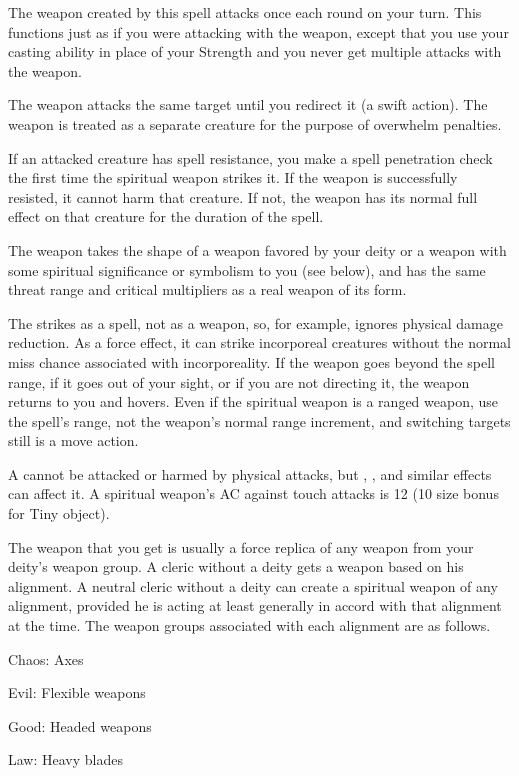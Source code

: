 \spellrng{\rngmed}
\begin{spelleffect}
  The weapon created by this spell attacks once each round on your turn. This functions just as if you were attacking with the weapon, except that you use your casting ability in place of your Strength and you never get multiple attacks with the weapon.
  \par The weapon attacks the same target until you redirect it (a swift action). The weapon is treated as a separate creature for the purpose of overwhelm penalties.
  \par If an attacked creature has spell resistance, you make a spell penetration check the first time the spiritual weapon strikes it. If the weapon is successfully resisted, it cannot harm that creature. If not, the weapon has its normal full effect on that creature for the duration of the spell.
  \par The weapon takes the shape of a weapon favored by your deity or a weapon with some spiritual significance or symbolism to you (see below), and has the same threat range and critical multipliers as a real weapon of its form.
\end{spelleffect}
\begin{spellnotes}
  The  strikes as a spell, not as a weapon, so, for example, ignores physical damage reduction. As a force effect, it can strike incorporeal creatures without the normal miss chance associated with incorporeality. If the weapon goes beyond the spell range, if it goes out of your sight, or if you are not directing it, the weapon returns to you and hovers. Even if the spiritual weapon is a ranged weapon, use the spell's range, not the weapon's normal range increment, and switching targets still is a move action.
  \par A  cannot be attacked or harmed by physical attacks, but , , and similar effects can affect it. A spiritual weapon's AC against touch attacks is 12 (10 \add size bonus for Tiny object).
  \par The weapon that you get is usually a force replica of any weapon from your deity's weapon group. A cleric without a deity gets a weapon based on his alignment. A neutral cleric without a deity can create a spiritual weapon of any alignment, provided he is acting at least generally in accord with that alignment at the time. The weapon groups associated with each alignment are as follows.
  \par Chaos: Axes
  \par Evil: Flexible weapons
  \par Good: Headed weapons
  \par Law: Heavy blades
\end{spellnotes}

